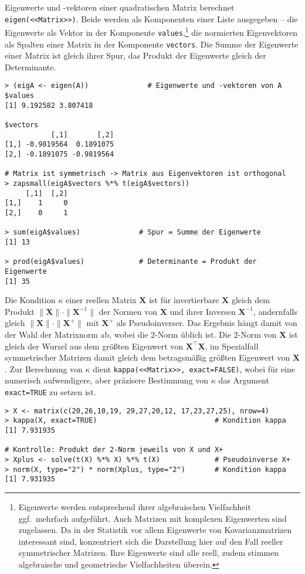 Eigenwerte und -vektoren einer quadratischen Matrix berechnet \lstinline!eigen(<<Matrix>>)!. Beide werden als Komponenten einer Liste ausgegeben -- die Eigenwerte als Vektor in der Komponente \lstinline!values!,\footnote{Eigenwerte werden entsprechend ihrer algebraischen Vielfachheit ggf.\ mehrfach aufgeführt. Auch Matrizen mit komplexen Eigenwerten sind zugelassen. Da in der Statistik vor allem Eigenwerte von Kovarianzmatrizen interessant sind, konzentriert sich die Darstellung hier auf den Fall reeller symmetrischer Matrizen. Ihre Eigenwerte sind alle reell, zudem stimmen algebraische und geometrische Vielfachheiten überein.} die normierten Eigenvektoren als Spalten einer Matrix in der Komponente \lstinline!vectors!. Die Summe der Eigenwerte einer Matrix ist gleich ihrer Spur, das Produkt der Eigenwerte gleich der Determinante.
\begin{lstlisting}
> (eigA <- eigen(A))              # Eigenwerte und -vektoren von A
$values
[1] 9.192582 3.807418

$vectors
           [,1]       [,2]
[1,] -0.9819564  0.1891075
[2,] -0.1891075 -0.9819564

# Matrix ist symmetrisch -> Matrix aus Eigenvektoren ist orthogonal
> zapsmall(eigA$vectors %*% t(eigA$vectors))
     [,1]  [,2]
[1,]    1     0
[2,]    0     1

> sum(eigA$values)              # Spur = Summe der Eigenwerte
[1] 13

> prod(eigA$values)             # Determinante = Produkt der Eigenwerte
[1] 35
\end{lstlisting}

Die Kondition $\kappa$ einer reellen Matrix $\bm{X}$ ist für invertierbare $\bm{X}$ gleich dem Produkt $\|\bm{X}\| \cdot \|\bm{X}^{-1}\|$ der Normen von $\bm{X}$ und ihrer Inversen $\bm{X}^{-1}$, andernfalls gleich $\|\bm{X}\| \cdot \|\bm{X}^{+}\|$ mit $\bm{X}^{+}$ als Pseudoinverser. Das Ergebnis hängt damit von der Wahl der Matrixnorm ab, wobei die $2$-Norm üblich ist. Die $2$-Norm von $\bm{X}$ ist gleich der Wurzel aus dem größten Eigenwert von $\bm{X}^{\top} \bm{X}$, im Spezialfall symmetrischer Matrizen damit gleich dem betragsmäßig größten Eigenwert von $\bm{X}$. Zur Berechnung von $\kappa$ dient \lstinline!kappa(<<Matrix>>, exact=FALSE)!, wobei für eine numerisch aufwendigere, aber präzisere Bestimmung von $\kappa$ das Argument \lstinline!exact=TRUE! zu setzen ist.
\begin{lstlisting}
> X <- matrix(c(20,26,10,19, 29,27,20,12, 17,23,27,25), nrow=4)
> kappa(X, exact=TRUE)                            # Kondition kappa
[1] 7.931935

# Kontrolle: Produkt der 2-Norm jeweils von X und X+
> Xplus <- solve(t(X) %*% X) %*% t(X)             # Pseudoinverse X+
> norm(X, type="2") * norm(Xplus, type="2")       # Kondition kappa
[1] 7.931935
\end{lstlisting}

